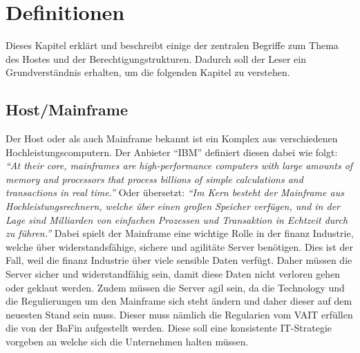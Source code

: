 \chapter{Definitionen}
\label{ch:chapter02}
Dieses Kapitel erklärt und beschreibt einige der zentralen Begriffe zum Thema des Hostes und der Berechtigungstrukturen.
Dadurch soll der Leser ein Grundverständnis erhalten, um die folgenden Kapitel zu verstehen.

%
%

\section{Host/Mainframe}
\label{sec:Host}
Der Host oder als auch Mainframe bekannt ist ein Komplex aus verschiedenen Hochleistungscomputern.
Der Anbieter "`IBM"' definiert diesen dabei wie folgt: 
\newline
\newline
\textit{"`At their core, mainframes are high-performance computers with large amounts of memory and processors that process billions of simple calculations and transactions in real time."'} \cite{Mainframe}
\newline
\newline
Oder übersetzt:
\newline
\newline
\textit{"`Im Kern besteht der Mainframe aus Hochleistungsrechnern, welche über einen großen Speicher verfügen, und in der Lage sind Milliarden von einfachen Prozessen und Transaktion in Echtzeit durch zu führen."'} \cite{Mainframe}
\newline
\newline
Dabei spielt der Mainframe eine wichtige Rolle in der finanz Industrie, welche über widerstandsfähige, sichere und agilitäte Server benötigen.
Dies ist der Fall, weil die finanz Industrie über viele sensible Daten verfügt.
Daher müssen die Server sicher und widerstandfähig sein, damit diese Daten nicht verloren gehen oder geklaut werden.
Zudem müssen die Server agil sein, da die Technology und die Regulierungen um den Mainframe sich steht ändern und daher dieser auf dem neuesten Stand sein muss.
Dieser muss nämlich die Regularien vom \ac{VAIT} erfüllen die von der \ac{BaFin} aufgestellt werden.
Diese soll eine konsistente IT-Strategie vorgeben an welche sich die Unternehmen halten müssen. \cite{Vait}

